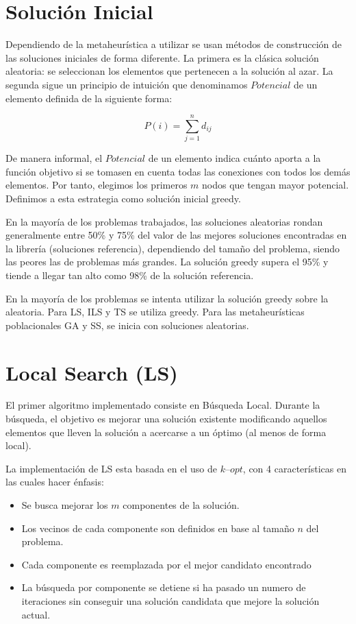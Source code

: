 \documentclass{ci5652}
\begin{document}
\section{Solución Inicial}
Dependiendo de la metaheurística a utilizar se usan métodos de construcción de las soluciones iniciales de forma diferente. La primera es la clásica solución aleatoria: se seleccionan los elementos que pertenecen a la solución al azar. La segunda sigue un principio de intuición que denominamos $Potencial$ de un elemento definida de la siguiente forma:

$$P(i)=\sum_{j=1}^{n}d_{ij}$$

De manera informal, el $Potencial$ de un elemento indica cuánto aporta a la función objetivo si se tomasen en cuenta todas las conexiones con todos los demás elementos. Por tanto, elegimos los primeros $m$ nodos que tengan mayor potencial. Definimos a esta estrategia como solución inicial greedy.

En la mayoría de los problemas trabajados, las soluciones aleatorias rondan generalmente entre 50\% y 75\% del valor de las mejores soluciones encontradas en la librería (soluciones referencia), dependiendo del tamaño del problema, siendo las peores las de problemas más grandes. La solución greedy supera el 95\% y tiende a llegar tan alto como 98\% de la solución referencia.

En la mayoría de los problemas se intenta utilizar la solución greedy sobre la aleatoria. Para LS, ILS y TS se utiliza greedy. Para las metaheurísticas poblacionales GA y SS, se inicia con soluciones aleatorias.

\section{Local Search (LS)}
El primer algoritmo implementado consiste en Búsqueda Local. Durante la búsqueda, el objetivo es mejorar una solución existente modificando aquellos elementos que lleven la solución a acercarse a un óptimo (al menos de forma local).

La implementación de LS esta basada en el uso de $k\text{--}opt$, con 4 características en las cuales hacer énfasis:
\begin{itemize} \itemsep5pt
	\item Se busca mejorar los $m$ componentes de la solución.
	\item Los vecinos de cada componente son definidos en base al tamaño $n$ del problema.
	\item Cada componente es reemplazada por el mejor candidato encontrado
	\item La búsqueda por componente se detiene si ha pasado un numero de iteraciones sin conseguir una solución candidata que mejore la solución actual.
\end{itemize}
\end{document}

